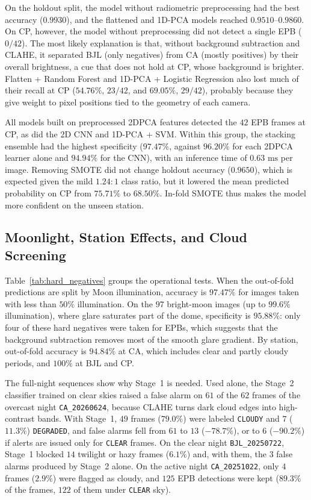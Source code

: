 On the holdout split, the model without radiometric preprocessing had the best accuracy ($0.9930$), and the flattened and 1D-PCA models reached $0.9510$--$0.9860$. On CP, however, the model without preprocessing did not detect a single EPB ($0/42$). The most likely explanation is that, without background subtraction and CLAHE, it separated BJL (only negatives) from CA (mostly positives) by their overall brightness, a cue that does not hold at CP, whose background is brighter. Flatten + Random Forest and 1D-PCA + Logistic Regression also lost much of their recall at CP ($54.76\%$, $23/42$, and $69.05\%$, $29/42$), probably because they give weight to pixel positions tied to the geometry of each camera.

All models built on preprocessed 2DPCA features detected the $42$ EPB frames at CP, as did the 2D CNN and 1D-PCA + SVM. Within this group, the stacking ensemble had the highest specificity ($97.47\%$, against $96.20\%$ for each 2DPCA learner alone and $94.94\%$ for the CNN), with an inference time of $0.63\text{ ms}$ per image. Removing SMOTE did not change holdout accuracy ($0.9650$), which is expected given the mild $1.24:1$ class ratio, but it lowered the mean predicted probability on CP from $75.71\%$ to $68.50\%$. In-fold SMOTE thus makes the model more confident on the unseen station.

\subsection{Moonlight, Station Effects, and Cloud Screening}

Table~\ref{tab:hard_negatives} groups the operational tests. When the out-of-fold predictions are split by Moon illumination, accuracy is $97.47\%$ for images taken with less than $50\%$ illumination. On the $97$ bright-moon images (up to $99.6\%$ illumination), where glare saturates part of the dome, specificity is $95.88\%$: only four of these hard negatives were taken for EPBs, which suggests that the background subtraction removes most of the smooth glare gradient. By station, out-of-fold accuracy is $94.84\%$ at CA, which includes clear and partly cloudy periods, and $100\%$ at BJL and CP.

The full-night sequences show why Stage~1 is needed. Used alone, the Stage~2 classifier trained on clear skies raised a false alarm on $61$ of the $62$ frames of the overcast night \texttt{CA\_20260624}, because CLAHE turns dark cloud edges into high-contrast bands. With Stage~1, $49$ frames ($79.0\%$) were labeled \texttt{CLOUDY} and $7$ ($11.3\%$) \texttt{DEGRADED}, and false alarms fell from $61$ to $13$ ($-78.7\%$), or to $6$ ($-90.2\%$) if alerts are issued only for \texttt{CLEAR} frames. On the clear night \texttt{BJL\_20250722}, Stage~1 blocked $14$ twilight or hazy frames ($6.1\%$) and, with them, the $3$ false alarms produced by Stage~2 alone. On the active night \texttt{CA\_20251022}, only $4$ frames ($2.9\%$) were flagged as cloudy, and $125$ EPB detections were kept ($89.3\%$ of the frames, $122$ of them under \texttt{CLEAR} sky).

